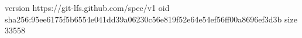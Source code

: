 version https://git-lfs.github.com/spec/v1
oid sha256:95ee6175f5b6554e041dd39a06230c56e819f52e64e54ef56ff00a8696ef3d3b
size 33558
